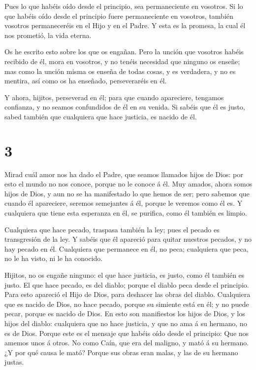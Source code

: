  Pues lo que habéis oído desde el principio, sea
permaneciente en vosotros. Si lo que habéis oído desde el principio
fuere permaneciente en vosotros, también vosotros permaneceréis en el
Hijo y en el Padre.  Y esta es la promesa, la cual él nos
prometió, la vida eterna.

 Os he escrito esto sobre los que os engañan. 
Pero la unción que vosotros habéis recibido de él, mora en vosotros, y
no tenéis necesidad que ninguno os enseñe; mas como la unción misma os
enseña de todas cosas, y es verdadera, y no es mentira, así como os ha
enseñado, perseveraréis en él.

 Y ahora, hijitos, perseverad en él; para que cuando
apareciere, tengamos confianza, y no seamos confundidos de él en su
venida.  Si sabéis que él es justo, sabed también que
cualquiera que hace justicia, es nacido de él.

\hypertarget{section-2}{%
\section{3}\label{section-2}}

 Mirad cuál amor nos ha dado el Padre, que seamos llamados
hijos de Dios: por esto el mundo no nos conoce, porque no le conoce á
él.  Muy amados, ahora somos hijos de Dios, y aun no se ha
manifestado lo que hemos de ser; pero sabemos que cuando él apareciere,
seremos semejantes á él, porque le veremos como él es.  Y
cualquiera que tiene esta esperanza en él, se purifica, como él también
es limpio.

 Cualquiera que hace pecado, traspasa también la ley; pues
el pecado es transgresión de la ley.  Y sabéis que él
apareció para quitar nuestros pecados, y no hay pecado en él.
 Cualquiera que permanece en él, no peca; cualquiera que
peca, no le ha visto, ni le ha conocido.

 Hijitos, no os engañe ninguno: el que hace justicia, es
justo, como él también es justo.  El que hace pecado, es del
diablo; porque el diablo peca desde el principio. Para esto apareció el
Hijo de Dios, para deshacer las obras del diablo. 
Cualquiera que es nacido de Dios, no hace pecado, porque su simiente
está en él; y no puede pecar, porque es nacido de Dios.  En
esto son manifiestos los hijos de Dios, y los hijos del diablo:
cualquiera que no hace justicia, y que no ama á su hermano, no es de
Dios.  Porque este es el mensaje que habéis oído desde el
principio: Que nos amemos unos á otros.  No como Caín, que
era del maligno, y mató á su hermano. ¿Y por qué causa le mató? Porque
sus obras eran malas, y las de su hermano justas.

